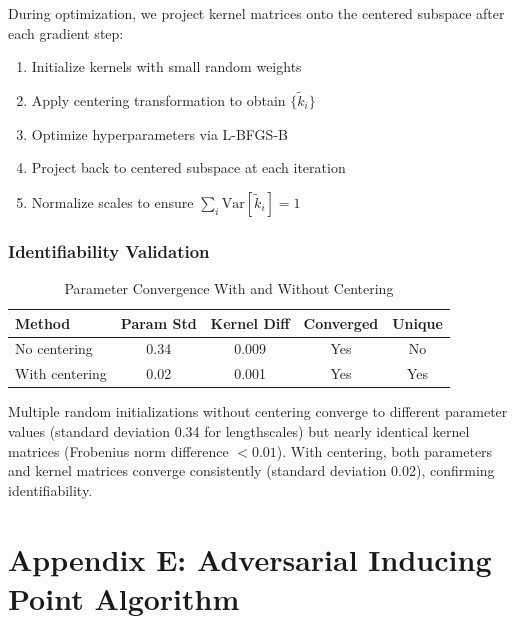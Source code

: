 \documentclass[12pt]{article}
\begin{document}
During optimization, we project kernel matrices onto the centered subspace after each gradient step:
\begin{enumerate}
\item Initialize kernels with small random weights
\item Apply centering transformation to obtain $\{\tilde{k}_i\}$
\item Optimize hyperparameters via L-BFGS-B
\item Project back to centered subspace at each iteration
\item Normalize scales to ensure $\sum_i \text{Var}[\tilde{k}_i] = 1$
\end{enumerate}

\subsubsection{Identifiability Validation}

\begin{table}[H]
\centering
\caption{Parameter Convergence With and Without Centering}
\begin{tabular}{lcccc}
\toprule
\textbf{Method} & \textbf{Param Std} & \textbf{Kernel Diff} & \textbf{Converged} & \textbf{Unique} \\
\midrule
No centering & 0.34 & 0.009 & Yes & No \\
With centering & 0.02 & 0.001 & Yes & Yes \\
\bottomrule
\end{tabular}
\end{table}

Multiple random initializations without centering converge to different parameter values (standard deviation 0.34 for lengthscales) but nearly identical kernel matrices (Frobenius norm difference $<0.01$). With centering, both parameters and kernel matrices converge consistently (standard deviation 0.02), confirming identifiability.

\section{Appendix E: Adversarial Inducing Point Algorithm}
\end{document}
